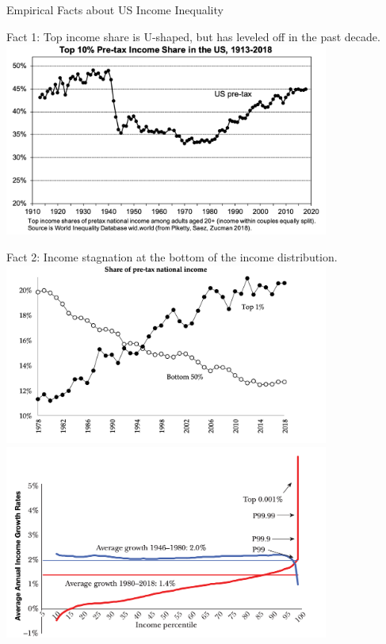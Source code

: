 \documentclass[10pt]{extarticle}
\begin{document}
  \begin{problem}{Empirical Facts about US Income Inequality}
    \begin{center}
      Fact 1: Top income share is U-shaped, but has leveled off in the past decade.\\
      \includegraphics[width=0.8\textwidth]{images/pretax_income.png}
    \end{center}
    \begin{center}
      Fact 2: Income stagnation at the bottom of the income distribution.\\
      \includegraphics[width=0.8\textwidth]{images/bottom_stagnation.png}\\
      \includegraphics[width=0.8\textwidth]{images/bottom_stagnation_2.png}

\end{center}
\end{problem}
\end{document}
